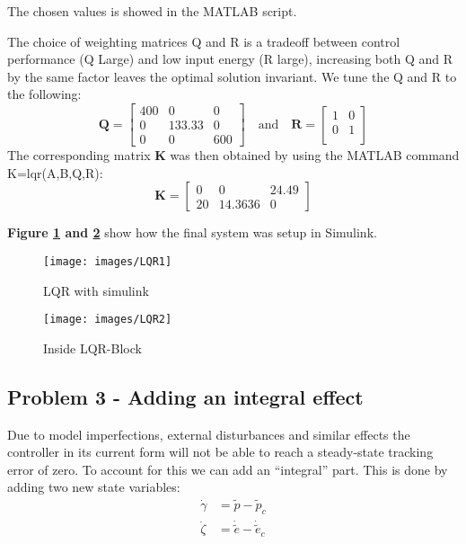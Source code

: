 The chosen values is showed in the MATLAB script.

The choice of weighting matrices Q and R is a tradeoff between control performance (Q Large) and low input energy (R large), increasing both Q and R by the same factor leaves the optimal solution invariant. We tune the Q and R to the following:
\begin{equation}
    \mathbf{Q} =
    \begin{bmatrix}
        400 & 0 & 0 \\
        0 & 133.33 & 0 \\
        0 & 0 & 600
    \end{bmatrix}
    \quad \mathrm{and} \quad \mathbf{R} =
    \begin{bmatrix}
        1 & 0 \\
        0 & 1 \\
    \end{bmatrix}
\end{equation}
The corresponding matrix $\mathbf{K}$ was then obtained by using the MATLAB command {\selectfont K=lqr(A,B,Q,R)}:
\begin{equation}
    \mathbf{K} = 
    \begin{bmatrix}
    0 & 0 & 24.49 \\
    20 & 14.3636 & 0
    \end{bmatrix}
\end{equation}


\textbf{Figure \ref{sim:2} and \ref{sim:3}}  show how the final system was setup in Simulink.

\begin{figure}[!htb]
 \centering
    \texttt{[image: images/LQR1]}
       \caption{LQR with simulink}
    \label{sim:2}
\end{figure}




\begin{figure}[!htb]
 \centering
    \texttt{[image: images/LQR2]}
       \caption{Inside LQR-Block}
    \label{sim:3}
\end{figure}









\newpage

\subsection{Problem 3 - Adding an integral effect }
Due to model imperfections, external disturbances and similar effects the controller
in its current form will not be able to reach a steady-state tracking error of zero. To account for this we can add an “integral” part. This is done by adding two new state variables:
\begin{equation}
\begin{split}
    \dot{\gamma} &= \tilde{p} - \tilde{p}_c \\
    \dot{\zeta} &= \dot{\tilde{e}} - \dot{\tilde{e}}_c
\end{split}
\end{equation}


